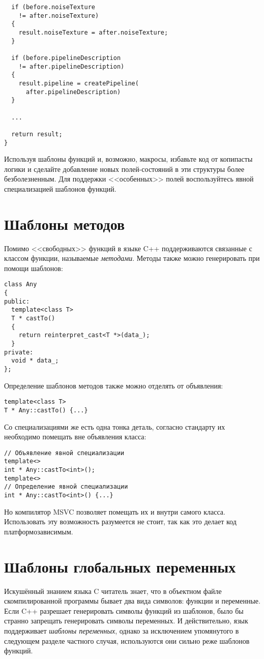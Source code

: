 \begin{enumerate}
\begin{verbatim}
  if (before.noiseTexture
    != after.noiseTexture)
  {
    result.noiseTexture = after.noiseTexture;
  }

  if (before.pipelineDescription
    != after.pipelineDescription)
  {
    result.pipeline = createPipeline(
      after.pipelineDescription)
  }

  ...

  return result;
}
\end{verbatim}
%
Используя шаблоны функций и, возможно, макросы, избавьте код от копипасты логики и сделайте добавление новых полей-состояний в эти структуры более безболезненным.
Для поддержки <<особенных>> полей воспользуйтесь явной специализацией шаблонов функций.
\end{enumerate}

\section{Шаблоны методов}
Помимо <<свободных>> функций в языке C++ поддерживаются связанные с классом функции, называемые \textit{методами}.
Методы также можно генерировать при помощи шаблонов:
\begin{verbatim}
class Any
{
public:
  template<class T>
  T * castTo()
  {
    return reinterpret_cast<T *>(data_);
  }
private:
  void * data_;
};
\end{verbatim}
Определение шаблонов методов также можно отделять от объявления:
\begin{verbatim}
template<class T>
T * Any::castTo() {...}
\end{verbatim}
Со специализациями же есть одна тонка деталь, согласно стандарту их необходимо помещать вне объявления класса:
\begin{verbatim}
// Объявление явной специализации
template<>
int * Any::castTo<int>();
template<>
// Определение явной специализации
int * Any::castTo<int>() {...}
\end{verbatim}
Но компилятор MSVC позволяет помещать их и внутри самого класса.
Использовать эту возможность разумеется не стоит, так как это делает код платформозависимым.

\section{Шаблоны глобальных переменных}

Искушённый знанием языка C читатель знает, что в объектном файле скомпилированной программы бывает два вида символов: функции и переменные.
Если C++ разрешает генерировать символы функций из шаблонов, было бы странно запрещать генерировать символы переменных.
И действительно, язык поддерживает \textit{шаблоны переменных}, однако за исключением упомянутого в следующем разделе частного случая, используются они сильно реже шаблонов функций.

